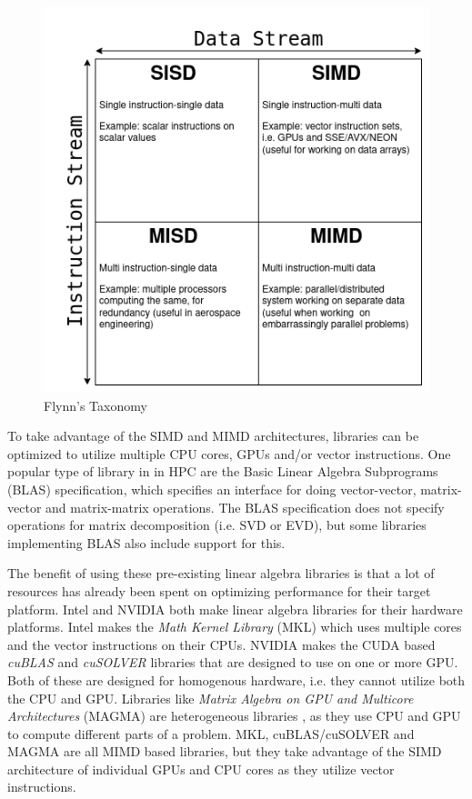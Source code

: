 \begin{figure}[H]
    \centering
    \includegraphics[scale=0.45]{Figures/flynns_taxonomy.png}
    \caption{Flynn's Taxonomy}
    \label{fig:flynn:taxonomy}
\end{figure}

To take advantage of the SIMD and MIMD architectures, libraries can be optimized to utilize multiple CPU cores, GPUs and/or vector instructions. One popular type of library in in HPC are the Basic Linear Algebra Subprograms (BLAS) specification, which specifies an interface for doing vector-vector, matrix-vector and matrix-matrix operations. The BLAS specification does not specify operations for matrix decomposition (i.e. SVD or EVD), but some libraries implementing BLAS also include support for this.

The benefit of using these pre-existing linear algebra libraries is that a lot of resources has already been spent on optimizing performance for their target platform. Intel and NVIDIA both make linear algebra libraries for their hardware platforms. Intel makes the \textit{Math Kernel Library} (MKL) \cite{intel:mkl} which uses multiple cores and the vector instructions on their CPUs. NVIDIA makes the CUDA based \textit{cuBLAS} and \textit{cuSOLVER} libraries \cite{nvidia:cuda} that are designed to use on one or more GPU. Both of these are designed for homogenous hardware, i.e. they cannot utilize both the CPU and GPU. Libraries like \textit{Matrix Algebra on GPU and Multicore Architectures} (MAGMA) are heterogeneous libraries \cite{tomov:magma}, as they use CPU and GPU to compute different parts of a problem. MKL, cuBLAS/cuSOLVER and MAGMA are all MIMD based libraries, but they take advantage of the SIMD architecture of individual GPUs and CPU cores as they utilize vector instructions.

